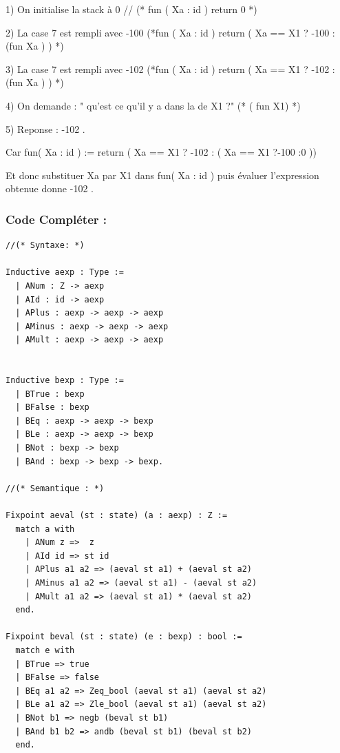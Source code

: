 \documentclass{article}
\begin{document}
\medskip

1) On initialise la stack à 0  // (* fun ( Xa : id ) return 0  *)

2) La case 7 est rempli avec -100 (*fun ( Xa : id ) return ( Xa == X1 ? -100 : (fun Xa ) )  *) 

3) La case 7 est rempli avec -102 (*fun ( Xa : id )  return ( Xa == X1 ? -102 : (fun Xa ) ) *) 

4) On demande : " qu'est ce qu'il y a dans la de X1 ?" (* ( fun X1) *)

\medskip

5) Reponse : -102 . 

Car  fun( Xa : id )  := return ( Xa == X1 ? -102 : ( Xa == X1 ?-100 :0 ))

Et donc substituer Xa par X1 dans fun( Xa : id ) puis évaluer l'expression obtenue donne -102 . 

\pagebreak

\subsubsection{ Code Compléter  :}

\begin{lstlisting}[style=CStyle]
//(* Syntaxe: *)

Inductive aexp : Type :=
  | ANum : Z -> aexp
  | AId : id -> aexp
  | APlus : aexp -> aexp -> aexp
  | AMinus : aexp -> aexp -> aexp
  | AMult : aexp -> aexp -> aexp
 
  
Inductive bexp : Type :=
  | BTrue : bexp
  | BFalse : bexp
  | BEq : aexp -> aexp -> bexp
  | BLe : aexp -> aexp -> bexp
  | BNot : bexp -> bexp
  | BAnd : bexp -> bexp -> bexp.

//(* Semantique : *)
  
Fixpoint aeval (st : state) (a : aexp) : Z :=
  match a with
    | ANum z =>  z 
    | AId id => st id
    | APlus a1 a2 => (aeval st a1) + (aeval st a2) 
    | AMinus a1 a2 => (aeval st a1) - (aeval st a2)
    | AMult a1 a2 => (aeval st a1) * (aeval st a2)
  end.

Fixpoint beval (st : state) (e : bexp) : bool :=
  match e with
  | BTrue => true
  | BFalse => false
  | BEq a1 a2 => Zeq_bool (aeval st a1) (aeval st a2)
  | BLe a1 a2 => Zle_bool (aeval st a1) (aeval st a2)
  | BNot b1 => negb (beval st b1)
  | BAnd b1 b2 => andb (beval st b1) (beval st b2)
  end.

\end{lstlisting}
\end{document}
